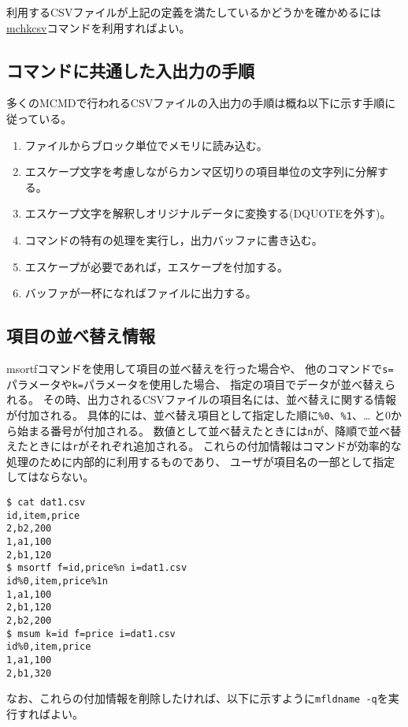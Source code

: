 利用するCSVファイルが上記の定義を満たしているかどうかを確かめるには
\hyperref[sect:mchkcsv]{mchkcsv}コマンドを利用すればよい。

\subsection{コマンドに共通した入出力の手順}

多くのMCMDで行われるCSVファイルの入出力の手順は概ね以下に示す手順に従っている。

\begin{enumerate}
\item ファイルからブロック単位でメモリに読み込む。
\item エスケープ文字を考慮しながらカンマ区切りの項目単位の文字列に分解する。
\item エスケープ文字を解釈しオリジナルデータに変換する(DQUOTEを外す)。
\item コマンドの特有の処理を実行し，出力バッファに書き込む。
\item エスケープが必要であれば，エスケープを付加する。
\item バッファが一杯になればファイルに出力する。
\end{enumerate}


\subsection{項目の並べ替え情報\label{sect:csv_sort}}

msortfコマンドを使用して項目の並べ替えを行った場合や、
他のコマンドで\verb|s=|パラメータや\verb|k=|パラメータを使用した場合、
指定の項目でデータが並べ替えられる。
その時、出力されるCSVファイルの項目名には、並べ替えに関する情報が付加される。
具体的には、並べ替え項目として指定した順に\verb|%0|、\verb|%1|、\ldots
と0から始まる番号が付加される。
数値として並べ替えたときには\verb|n|が、降順で並べ替えたときには\verb|r|がそれぞれ追加される。
これらの付加情報はコマンドが効率的な処理のために内部的に利用するものであり、
ユーザが項目名の一部として指定してはならない。

\begin{Verbatim}[baselinestretch=0.7,frame=single]
$ cat dat1.csv
id,item,price
2,b2,200
1,a1,100
2,b1,120
$ msortf f=id,price%n i=dat1.csv
id%0,item,price%1n
1,a1,100
2,b1,120
2,b2,200
$ msum k=id f=price i=dat1.csv
id%0,item,price
1,a1,100
2,b1,320
\end{Verbatim}

なお、これらの付加情報を削除したければ、以下に示すように\verb|mfldname -q|を実行すればよい。


